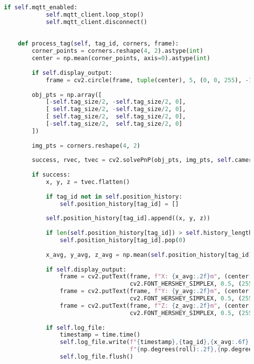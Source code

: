 \begin{lstlisting}[language=Python]
        if self.mqtt_enabled:
            self.mqtt_client.loop_stop()
            self.mqtt_client.disconnect()
    
    
    def process_tag(self, tag_id, corners, frame):
        corner_points = corners.reshape(4, 2).astype(int)
        center = np.mean(corner_points, axis=0).astype(int)
    
        if self.display_output:
            frame = cv2.circle(frame, tuple(center), 5, (0, 0, 255), -1)
    
        obj_pts = np.array([
            [-self.tag_size/2, -self.tag_size/2, 0],
            [ self.tag_size/2, -self.tag_size/2, 0],
            [ self.tag_size/2,  self.tag_size/2, 0],
            [-self.tag_size/2,  self.tag_size/2, 0]
        ])
    
        img_pts = corners.reshape(4, 2)
    
        success, rvec, tvec = cv2.solvePnP(obj_pts, img_pts, self.camera_matrix, self.dist_coeffs)
    
        if success:
            x, y, z = tvec.flatten()
    
            if tag_id not in self.position_history:
                self.position_history[tag_id] = []
    
            self.position_history[tag_id].append((x, y, z))
    
            if len(self.position_history[tag_id]) > self.history_length:
                self.position_history[tag_id].pop(0)
    
            x_avg, y_avg, z_avg = np.mean(self.position_history[tag_id], axis=0)
    
            if self.display_output:
                frame = cv2.putText(frame, f"X: {x_avg:.2f}m", (center[0] + 10, center[1] + 20),
                                    cv2.FONT_HERSHEY_SIMPLEX, 0.5, (255, 0, 0), 2)
                frame = cv2.putText(frame, f"Y: {y_avg:.2f}m", (center[0] + 10, center[1] + 40),
                                    cv2.FONT_HERSHEY_SIMPLEX, 0.5, (255, 0, 0), 2)
                frame = cv2.putText(frame, f"Z: {z_avg:.2f}m", (center[0] + 10, center[1] + 60),
                                    cv2.FONT_HERSHEY_SIMPLEX, 0.5, (255, 0, 0), 2)
    
            if self.log_file:
                timestamp = time.time()
                self.log_file.write(f"{timestamp},{tag_id},{x_avg:.6f},{y_avg:.6f},{z_avg:.6f},"
                                    f"{np.degrees(roll):.2f},{np.degrees(pitch):.2f},{np.degrees(yaw):.2f}\n")
                self.log_file.flush()
    

\end{lstlisting}
